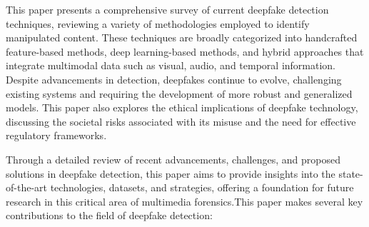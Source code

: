 \documentclass[lettersize,journal]{IEEEtran}
\begin{document}
This paper presents a comprehensive survey of current deepfake detection techniques, reviewing a variety of methodologies employed to identify manipulated content. These techniques are broadly categorized into handcrafted feature-based methods, deep learning-based methods, and hybrid approaches that integrate multimodal data such as visual, audio, and temporal information. Despite advancements in detection, deepfakes continue to evolve, challenging existing systems and requiring the development of more robust and generalized models. This paper also explores the ethical implications of deepfake technology, discussing the societal risks associated with its misuse and the need for effective regulatory frameworks.

Through a detailed review of recent advancements, challenges, and proposed solutions in deepfake detection, this paper aims to provide insights into the state-of-the-art technologies, datasets, and strategies, offering a foundation for future research in this critical area of multimedia forensics.This paper makes several key contributions to the field of deepfake detection:
\end{document}
